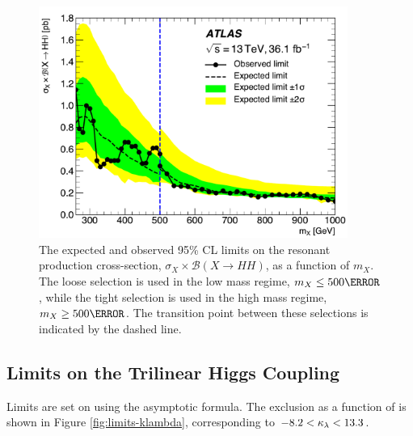 \begin{figure}[!htbp]
  \centering
\includegraphics[width=0.9\textwidth]{chapters/chapter5_yybb/images/limits/resonant.pdf}
\caption[The expected and observed limits on the resonant \HH production cross section as a function of $m_{X}$.]
{The expected and observed 95\% \gls{CL} limits on the resonant \HH production cross-section, $\sigma_{X} \times \mathcal{B}(X\rightarrow HH)$, as a function of $m_{X}$. The loose selection is used in the low mass regime, $m_{X} \leq \unit{500}{\GeV}$, while the tight selection is used in the high mass regime, $m_{X} \geq \unit{500}{\GeV}$. The transition point between these selections is indicated by the dashed line.} 
\label{fig:limits-resonant}
\end{figure}

\subsection{Limits on the Trilinear Higgs Coupling}

Limits are set on \klambda using the asymptotic formula. The exclusion as a function of \klambda is shown in Figure \ref{fig:limits-klambda}, corresponding to $-8.2 < \kappa_{\lambda} < 13.3$.

